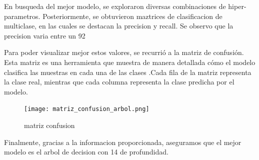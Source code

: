\documentclass[10pt,a4paper]{article}
\begin{document}
En busqueda del mejor modelo, se exploraron diversas combinaciones de hiper-parametros. Posteriormente, se obtuvieron maztrices de clasificacion de multiclase, en las cuales se destacan la precision y recall. Se observo que la precision varia entre un 92%

Para poder visualizar mejor estos valores, se recurrió a la matriz de confusión. Esta matriz es una herramienta que muestra de manera detallada cómo el modelo clasifica las muestras en cada una de las clases .Cada fila de la matriz representa la clase real, mientras que cada columna representa la clase predicha por el modelo.

\begin{figure}[h]
  \centering
  \texttt{[image: matriz\_confusion\_arbol.png]}
  \caption{matriz confusion}
  \label{fig:Tabla 1}
\end{figure}

Finalmente, gracias a la informacion proporcionada, aseguramos que el mejor modelo es el arbol de decision con 14 de profundidad.
\end{document}
